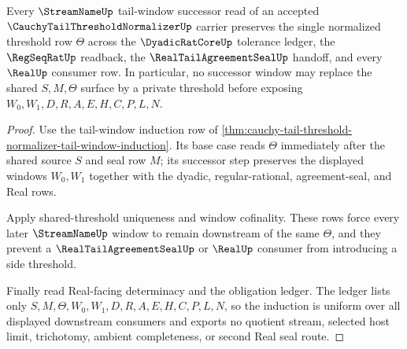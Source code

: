\begin{theorem}
\label{thm:cauchy-tail-threshold-normalizer-uniform-threshold-induction}
Every $\StreamNameUp$ tail-window successor read of an accepted $\CauchyTailThresholdNormalizerUp$ carrier preserves the single normalized threshold row $\Theta$ across the $\DyadicRatCoreUp$ tolerance ledger, the $\RegSeqRatUp$ readback, the $\RealTailAgreementSealUp$ handoff, and every $\RealUp$ consumer row. In particular, no successor window may replace the shared $S,M,\Theta$ surface by a private threshold before exposing $W_0,W_1,D,R,A,E,H,C,P,L,N$.
\end{theorem}
\begin{proof}
Use the tail-window induction row of \autoref{thm:cauchy-tail-threshold-normalizer-tail-window-induction}. Its base case reads $\Theta$ immediately after the shared source $S$ and seal row $M$; its successor step preserves the displayed windows $W_0,W_1$ together with the dyadic, regular-rational, agreement-seal, and Real rows.

Apply shared-threshold uniqueness and window cofinality. These rows force every later $\StreamNameUp$ window to remain downstream of the same $\Theta$, and they prevent a $\RealTailAgreementSealUp$ or $\RealUp$ consumer from introducing a side threshold.

Finally read Real-facing determinacy and the obligation ledger. The ledger lists only $S,M,\Theta,W_0,W_1,D,R,A,E,H,C,P,L,N$, so the induction is uniform over all displayed downstream consumers and exports no quotient stream, selected host limit, trichotomy, ambient completeness, or second Real seal route.
\end{proof}

